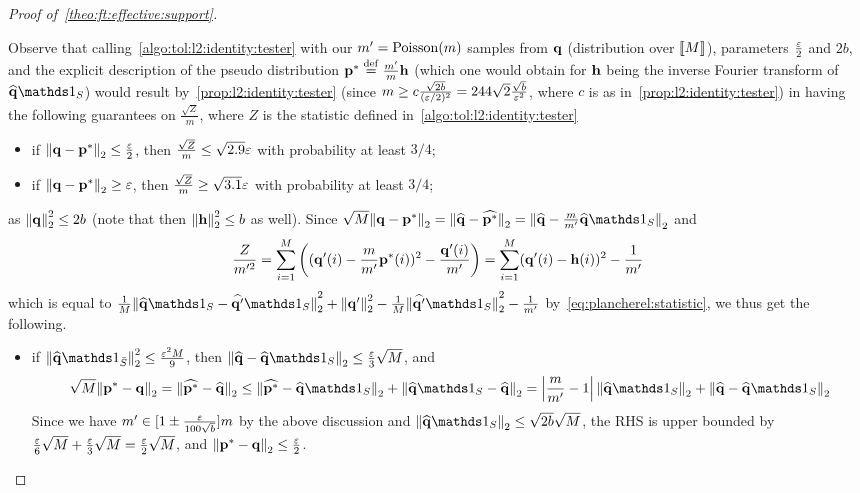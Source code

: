 \begin{proof}[Proof of~\cref{theo:ft:effective:support}]
\begin{itemize}
    Observe that calling~\cref{algo:tol:l2:identity:tester} with our $m'=\operatorname{Poisson}\!\left( m \right) $ samples from $\mathbf{q}$ (distribution over $\llbracket M\rrbracket$), parameters $\frac{\varepsilon}{2}$ and $2b$, and the explicit description of the pseudo distribution $\mathbf{p}^\ast\stackrel{\rm def}{=} \frac{m'}{m}\mathbf{h}$ (which one would obtain for $\mathbf{h}$ being the inverse Fourier transform of $\fourier{\q}\indicSet{S}$) would result by~\cref{prop:l2:identity:tester} (since $m \geq c\frac{\sqrt{2b}}{(\varepsilon/2)^2} = 244\sqrt{2}\frac{\sqrt{b}}{\varepsilon^2}$, where $c$ is as in~\cref{prop:l2:identity:tester}) in having the following guarantees on $\frac{\sqrt{Z}}{m}$, where $Z$ is the statistic defined in~\cref{algo:tol:l2:identity:tester}
    \begin{itemize}
      \item if ${\lVert\mathbf{q}-\mathbf{p}^\ast{\rVert}}_2 \leq \frac{\varepsilon}{2}$, then $\frac{\sqrt{Z}}{m} \leq \sqrt{2.9}\varepsilon$ with probability at least $3/4$;
      \item if ${\lVert\mathbf{q}-\mathbf{p}^\ast{\rVert}}_2 \geq \varepsilon$, then $\frac{\sqrt{Z}}{m} \geq \sqrt{3.1}\varepsilon$ with probability at least $3/4$;
    \end{itemize}
    as ${\lVert\mathbf{q}{\rVert}}_2^2 \leq 2b$ (note that then ${\lVert\mathbf{h}{\rVert}}_2^2 \leq b$ as well). Since $\sqrt{M}\normtwo{\q-\p^\ast} = \normtwo{\fourier{\q}-\fourier{\p^\ast}} = \normtwo{\fourier{\q}-\frac{m}{m'}\fourier{\q}\indicSet{S}}$ and     \[
      \frac{Z}{m'^2} = \sum_{i=1}^M \left( (\mathbf{q}'(i)-\frac{m}{m'}\mathbf{p}^\ast(i))^2 - \frac{\mathbf{q}'(i)}{m'} \right) = \sum_{i=1}^M (\mathbf{q}'(i)-\mathbf{h}(i))^2 - \frac{1}{m'}
    \]
    which is equal to $\frac{1}{M}\normtwo{\fourier{\q}\indicSet{S}-\fourier{\q'}\indicSet{S}}^2 + \normtwo{\q'}^2 - \frac{1}{M}\normtwo{\fourier{\q'}\indicSet{S}}^2 - \frac{1}{m'}$ by~\cref{eq:plancherel:statistic}, we thus get the following.
    \begin{itemize}
      \item if $\normtwo{\fourier{\q}\indicSet{\bar{S}}}^2 \leq \frac{\eps^2M}{9}$, then $\normtwo{\fourier{\q}-\fourier{\q}\indicSet{S}} \leq \frac{\eps}{3}\sqrt{M}$, and
      \[
          \sqrt{M}\normtwo{\p^\ast-\q} = \normtwo{\fourier{\p^\ast}-\fourier{\q}} \leq \normtwo{\fourier{\p^\ast}-\fourier{\q}\indicSet{S}} + \normtwo{\fourier{\q}\indicSet{S}-\fourier{\q}}
          = \abs{\frac{m}{m'}-1}\normtwo{\fourier{\q}\indicSet{S}} + \normtwo{\fourier{\q}-\fourier{\q}\indicSet{S}}
      \]
      Since we have $m'\in[1\pm\frac{\varepsilon}{100\sqrt{b}}]m$ by the above discussion and $\normtwo{\fourier{\q}\indicSet{S}}\leq \sqrt{2b}\sqrt{M}$, the RHS is upper bounded by $\frac{\varepsilon}{6}\sqrt{M} + \frac{\varepsilon}{3}\sqrt{M} = \frac{\varepsilon}{2}\sqrt{M}$, and ${\lVert\mathbf{p}^\ast-\mathbf{q}{\rVert}}_2 \leq \frac{\varepsilon}{2}$.

\end{itemize}
\end{itemize}
\end{proof}
